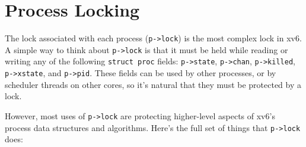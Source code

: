 \section{Process Locking}

The lock associated with each process (\lstinline{p->lock}) is the
most complex lock in xv6.
A simple way to think about \lstinline{p->lock} is
that it must be held while reading or writing any of the following
\lstinline{struct proc} fields:
\lstinline{p->state},
\lstinline{p->chan},
\lstinline{p->killed},
\lstinline{p->xstate},
and
\lstinline{p->pid}.
These fields can be used by other processes, or by scheduler
threads on other cores, so it's natural that they
must be protected by a lock.

However, most uses of \lstinline{p->lock} are protecting higher-level
aspects of xv6's process data structures and algorithms. Here's
the full set of things that \lstinline{p->lock} does:



